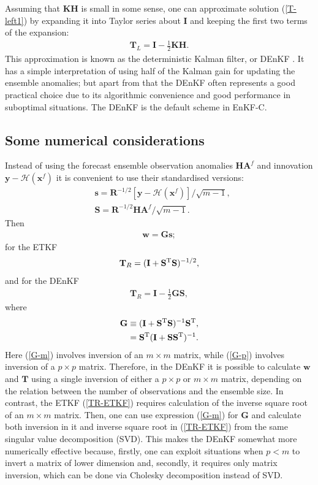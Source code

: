 \documentclass[11pt]{report}
\newcommand{\mb} {\mathbf}
\newcommand{\T}{^{\tiny \mathrm T}}
\begin{document}
Assuming that $\mb K \mb H$ is small in some sense, one can approximate solution (\ref{T-left1}) by expanding it into Taylor series about $\mb I$ and keeping the first two terms of the expansion:
\begin{align}
  \label{denkf}
  \mb T_L = \mb I - \frac{1}{2} \mb K \mb H.
\end{align}
This approximation is known as the deterministic Kalman filter, or DEnKF \citep{sak08a}.
It has a simple interpretation of using half of the Kalman gain for updating the ensemble anomalies; but apart from that the DEnKF often represents a good practical choice due to its algorithmic convenience and good performance in suboptimal situations.
The DEnKF is the default scheme in EnKF-C.

\subsection{Some numerical considerations}
\label{sec:numerical}

Instead of using the forecast ensemble observation anomalies $\mb H \mb A^f$ and innovation $\mb y - \mathcal H(\mb x^f)$ it is convenient to use their standardised versions:
\begin{align}
  \label{s}
  &\mb s = \mb R^{-1/2} \left[ \mb y - \mathcal H(\mb x^f) \right] / \sqrt{m - 1},\\
  \label{S}
  &\mb S = \mb R^{-1/2} \mb H \mb A^f / \sqrt{m - 1}.
\end{align}
Then
\begin{align}
  \mb w = \mb G \mb s;
\end{align}
for the ETKF
\begin{align}
  \label{TR-ETKF}
  \mb T_R = (\mb I + \mb S\T \mb S)^{-1/2},
\end{align}
and for the DEnKF
\begin{align}
  \label{TR-DEnKF}
  \mb T_R = \mb I - \frac{1}{2} \mb G \mb S,
\end{align}
where
\begin{align}
  \label{G-m}
  \mb G &\equiv (\mb I + \mb S\T \mb S)^{-1} \mb S\T,\\
  \label{G-p}
  & = \mb S\T ( \mb I + \mb S \mb S\T)^{-1}.
\end{align}
Here (\ref{G-m}) involves inversion of an $m \times m$ matrix, while (\ref{G-p}) involves inversion of a $p \times p$ matrix.
Therefore, in the DEnKF it is possible to calculate $\mb w$ and $\mb T$ using a single inversion of either a $p \times p$ or $m \times m$ matrix, depending on the relation between the number of observations and the ensemble size.
In contrast, the ETKF (\ref{TR-ETKF}) requires calculation of the inverse square root of an $m \times m$ matrix.
Then, one can use expression (\ref{G-m}) for $\mb G$ and calculate both inversion in it and inverse square root in (\ref{TR-ETKF}) from the same singular value decomposition (SVD).
This makes the DEnKF somewhat more numerically effective because, firstly, one can exploit situations when $p < m$ to invert a matrix of lower dimension and, secondly, it requires only matrix inversion, which can be done via Cholesky decomposition instead of SVD.
\end{document}
